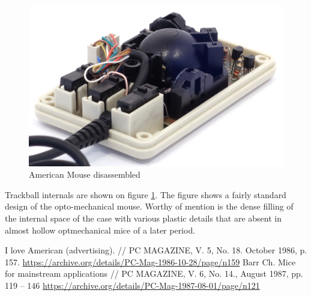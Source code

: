 \documentclass[11pt, a4paper]{article}
\begin{document}
\begin{figure}[h]
    \centering
    \includegraphics[scale=0.9]{1986_american_mouse/inside_60.jpg}
    \caption{American Mouse disassembled}
    \label{fig:AmericanInside}
\end{figure}

Trackball internals are shown on figure \ref{fig:AmericanInside}. The figure shows a fairly standard design of the opto-mechanical mouse. Worthy of mention is the dense filling of the internal space of the case with various plastic details that are absent in almost hollow optmechanical mice of a later period.

\begin{thebibliography}{9}
 I love American (advertising). // PC MAGAZINE, V. 5, No. 18. October 1986, p. 157. \url{https://archive.org/details/PC-Mag-1986-10-28/page/n159}
 Barr Ch. Mice for mainstream applications // PC MAGAZINE, V. 6, No. 14., August 1987, pp. 119 – 146 \url{https://archive.org/details/PC-Mag-1987-08-01/page/n121}
\end{thebibliography}
\end{document}
